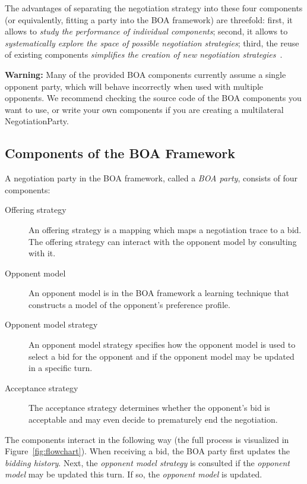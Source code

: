 \documentclass[]{article}
\begin{document}
The advantages of separating the negotiation strategy into these four components (or equivalently, fitting a party into the BOA framework) are threefold: first, it allows to \textit{study the performance of individual components}; second, it allows to \textit{systematically explore the space of possible negotiation strategies}; third, the reuse of existing components \textit{simplifies the creation of new negotiation strategies}~\cite{BaarslagComponentAnalysis}.

{\bf Warning:} Many of the provided BOA components currently assume a single opponent party, which will behave incorrectly when used with multiple opponents. We recommend checking the source code of the BOA components you want to use, or write your own components if you are creating a multilateral NegotiationParty.


\subsection{Components of the BOA Framework}
A negotiation party in the BOA framework, called a \textit{BOA party}, consists of four components:
\begin{description}
  \item[Offering strategy] An offering strategy is a mapping which maps a negotiation trace to a bid. The offering strategy can interact with the opponent model by consulting with it.%

  \item[Opponent model] An opponent model is in the BOA framework a learning technique that constructs a model of the opponent's preference profile.%
  \item[Opponent model strategy] An opponent model strategy specifies how the opponent model is used to select a bid for the opponent and if the opponent model may be updated in a specific turn.
  \item[Acceptance strategy] The acceptance strategy determines whether the opponent's bid is acceptable and may even decide to prematurely end the negotiation.
\end{description}
The components interact in the following way (the full process is visualized in Figure~\ref{fig:flowchart}). When receiving a bid, the BOA party first  updates the \textit{bidding history}. Next, the \textit{opponent model strategy} is consulted if the \textit{opponent model} may be updated this turn. If so, the \textit{opponent model} is updated.
\end{document}
